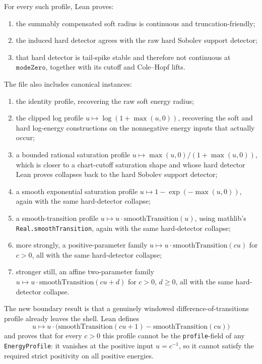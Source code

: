 \documentclass[11pt]{article}
\begin{document}
For every such profile, Lean proves:
\begin{enumerate}[leftmargin=1.5em]
  \item the summably compensated soft radius is continuous and
  truncation-friendly;
  \item the induced hard detector agrees with the raw hard Sobolev support
  detector;
  \item that hard detector is tail-spike stable and therefore not
  continuous at \(\texttt{modeZero}\), together with its cutoff and Cole--Hopf
  lifts.
\end{enumerate}

The file also includes canonical instances:
\begin{enumerate}[leftmargin=1.5em]
  \item the identity profile, recovering the raw soft energy radius;
  \item the clipped log profile \(u \mapsto \log(1+\max(u,0))\), recovering the
  soft and hard log-energy constructions on the nonnegative energy inputs that
  actually occur;
  \item a bounded rational saturation profile
  \(u \mapsto \max(u,0)/(1+\max(u,0))\), which is closer to a chart-cutoff
  saturation shape and whose hard detector Lean proves collapses back to the
  hard Sobolev support detector;
  \item a smooth exponential saturation profile
  \(u \mapsto 1-\exp(-\max(u,0))\), again with the same hard-detector collapse;
  \item a smooth-transition profile
  \(u \mapsto u \cdot \mathrm{smoothTransition}(u)\), using mathlib's
  \texttt{Real.smoothTransition}, again with the same hard-detector collapse;
  \item more strongly, a positive-parameter family
  \(u \mapsto u \cdot \mathrm{smoothTransition}(cu)\) for \(c>0\), all with the
  same hard-detector collapse;
  \item stronger still, an affine two-parameter family
  \(u \mapsto u \cdot \mathrm{smoothTransition}(cu+d)\) for \(c>0\), \(d\ge 0\),
  all with the
  same hard-detector collapse.
\end{enumerate}

The new boundary result is that a genuinely windowed difference-of-transitions
profile already leaves the shell.  Lean defines
\[
u \mapsto
u \cdot \bigl(\mathrm{smoothTransition}(cu+1)-\mathrm{smoothTransition}(cu)\bigr)
\]
and proves that for every \(c>0\) this profile cannot be the
\texttt{profile}-field of any \texttt{EnergyProfile}: it vanishes at the
positive input \(u=c^{-1}\), so it cannot satisfy the required strict
positivity on all positive energies.
\end{document}
